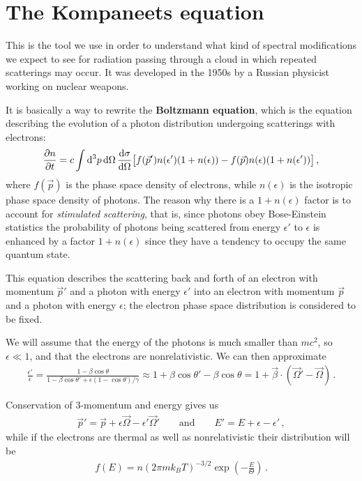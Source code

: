 \documentclass[main.tex]{subfiles}
\begin{document}
\section{The Kompaneets equation}

This is the tool we use in order to understand what kind of spectral modifications we expect to see for radiation passing through a cloud in which repeated scatterings may occur. 
It was developed in the 1950s by a Russian physicist working on nuclear weapons. 

It is basically a way to rewrite the \textbf{Boltzmann equation}, which is the equation describing the evolution of a photon distribution undergoing scatterings with electrons: 
%
\begin{align}
\pdv{n}{t} = c \int \dd[3]{p} \dd{\Omega } \dv{\sigma }{\Omega } 
\qty[f(\vec{p}') n(\epsilon ') (1 + n(\epsilon )) - f(\vec{p}) n(\epsilon ) (1 + n(\epsilon '))]
\,,
\end{align}
%
where \(f(\vec{p})\) is the phase space density of electrons, while \(n(\epsilon )\) is the isotropic phase space density of photons. 
The reason why there is a \(1 + n(\epsilon )\) factor is to account for \emph{stimulated scattering}, that is, since photons obey Bose-Einstein statistics the probability of photons being scattered from energy \(\epsilon '\) to \(\epsilon \) is enhanced by a factor \(1 + n (\epsilon )\) since they have a tendency to occupy the same quantum state. 

This equation describes the scattering back and forth of an electron with momentum \(\vec{p}'\) and a photon with energy \(\epsilon '\) into an electron with momentum \(\vec{p}\) and a photon with energy \(\epsilon \); the electron phase space distribution is considered to be  fixed. 

We will assume that the energy of the photons is much smaller than \(mc^2\), so \(\epsilon \ll 1\), and that the electrons are nonrelativistic. We can then approximate 
%
\begin{align}
\frac{\epsilon'}{\epsilon } = \frac{1 - \beta \cos \theta }{1 - \beta \cos \theta ' + \epsilon (1 - \cos \theta ) / \gamma } \approx 1 + \beta \cos \theta ' - \beta \cos \theta = 1 + \vec{\beta} \cdot (\vec{\Omega}' - \vec{\Omega})
\,.
\end{align}

Conservation of 3-momentum and energy gives us 
%
\begin{align}
\vec{p}' = \vec{p} + \epsilon \vec{\Omega} - \epsilon ' \vec{\Omega}' 
\qquad \text{and} \qquad
E' = E + \epsilon - \epsilon '
\,,
\end{align}
%
while if the electrons are thermal as well as nonrelativistic their distribution will be 
%
\begin{align}
f(E) = n (2 \pi m k_B T)^{-3/2} \exp(- \frac{E}{\Theta }) 
\,.
\end{align}
\end{document}
